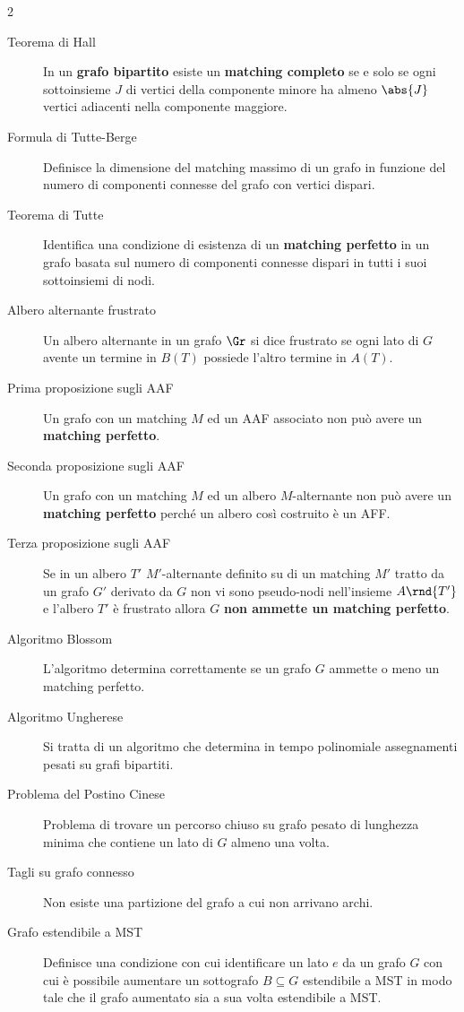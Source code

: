 \documentclass[\main/main.tex]{subfiles}
\begin{document}
\begin{multicols}{2}
\begin{description}
		\item[Teorema di Hall] In un \textbf{grafo bipartito} esiste un \textbf{matching completo} se e solo se ogni sottoinsieme \(J\) di vertici della componente minore ha almeno \(\abs{J}\) vertici adiacenti nella componente maggiore.
		\item[Formula di Tutte-Berge] Definisce la dimensione del matching massimo di un grafo in funzione del numero di componenti connesse del grafo con vertici dispari.
		\item[Teorema di Tutte] Identifica una condizione di esistenza di un \textbf{matching perfetto} in un grafo basata sul numero di componenti connesse dispari in tutti i suoi sottoinsiemi di nodi.
		\item[Albero alternante frustrato] Un albero alternante in un grafo \(\Gr \) si dice frustrato se ogni lato di \(G\) avente un termine in \(B(T)\) possiede l'altro termine in \(A(T)\).
		\item[Prima proposizione sugli AAF] Un grafo con un matching \(M\) ed un AAF associato non può avere un \textbf{matching perfetto}.
		\item[Seconda proposizione sugli AAF] Un grafo con un matching \(M\) ed un albero \(M\)-alternante non può avere un \textbf{matching perfetto} perché un albero così costruito è un AFF.
		\item[Terza proposizione sugli AAF] Se in un albero \(T'\) \(M'\)-alternante definito su di un matching \(M'\) tratto da un grafo \(G'\) derivato da \(G\) non vi sono pseudo-nodi nell'insieme \(A\rnd{T'}\) e l'albero \(T'\) è frustrato allora \(G\) \textbf{non ammette un matching perfetto}.
		\item[Algoritmo Blossom] L'algoritmo determina correttamente se un grafo \(G\) ammette o meno un matching perfetto.
		\item[Algoritmo Ungherese] Si tratta di un algoritmo che determina in tempo polinomiale assegnamenti pesati su grafi bipartiti.
		\item[Problema del Postino Cinese] Problema di trovare un percorso chiuso su grafo pesato di lunghezza minima che contiene un lato di \(G\) almeno una volta.
		\item[Tagli su grafo connesso] Non esiste una partizione del grafo a cui non arrivano archi.
		\item[Grafo estendibile a MST] Definisce una condizione con cui identificare un lato \(e\) da un grafo \(G\) con cui è possibile aumentare un sottografo \(B\subseteq G\) estendibile a MST in modo tale che il grafo aumentato sia a sua volta estendibile a MST.

\end{description}
\end{multicols}
\end{document}
